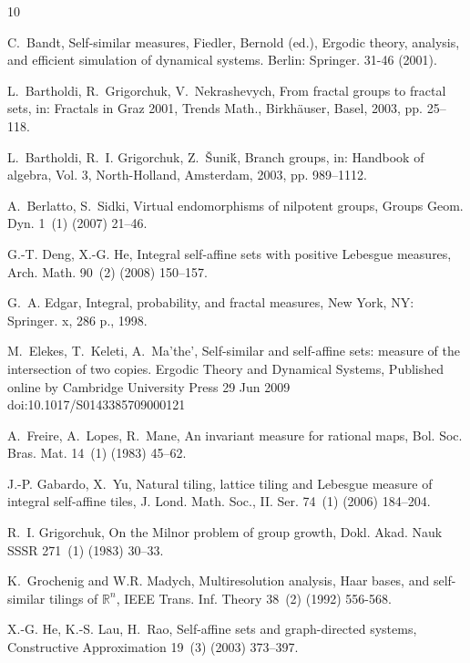\documentclass[12pt]{article}
\theoremstyle{definition}
\begin{document}

%
\begin{thebibliography}{10}

C.~Bandt, Self-similar measures, {Fiedler, Bernold (ed.), Ergodic theory,
  analysis, and efficient simulation of dynamical systems. Berlin: Springer.
  31-46 (2001).}

L.~Bartholdi, R.~Grigorchuk, V.~Nekrashevych, From fractal groups to fractal
  sets, in: Fractals in Graz 2001, Trends Math., Birkh\"auser, Basel, 2003, pp.
  25--118.

L.~Bartholdi, R.~I. Grigorchuk, Z.~{\v{S}}uni{\'k}, Branch groups, in: Handbook
  of algebra, Vol. 3, North-Holland, Amsterdam, 2003, pp. 989--1112.

A.~Berlatto, S.~Sidki, Virtual endomorphisms of nilpotent groups, Groups
  Geom. Dyn. 1~(1) (2007) 21--46.

G.-T. Deng, X.-G. He, Integral self-affine sets with positive Lebesgue
  measures, Arch. Math. 90~(2) (2008) 150--157.

G.~A. Edgar, Integral, probability, and fractal measures, {New York, NY:
  Springer. x, 286 p.}, 1998.

M.~Elekes, T.~Keleti, A.~Ma'the', Self-similar and self-affine sets: measure of the intersection of
two copies. Ergodic Theory and Dynamical Systems,  Published online by Cambridge University Press
29 Jun 2009 doi:10.1017/S0143385709000121


A.~Freire, A.~Lopes, R.~Mane, An invariant measure for rational maps, Bol.
  Soc. Bras. Mat. 14~(1) (1983) 45--62.

J.-P. Gabardo, X.~Yu, Natural tiling, lattice tiling and Lebesgue measure of
  integral self-affine tiles, J. Lond. Math. Soc., II. Ser. 74~(1) (2006)
  184--204.

R.~I. Grigorchuk, On the {M}ilnor problem of group growth, Dokl. Akad. Nauk
  SSSR 271~(1) (1983) 30--33.

K.~Grochenig and W.R. Madych, Multiresolution analysis, Haar bases, and self-similar tilings of
  $\mathbb{R}^n$,  IEEE Trans. Inf. Theory 38~(2) (1992) 556-568.


X.-G. He, K.-S. Lau, H.~Rao, Self-affine sets and graph-directed systems,
  Constructive Approximation 19~(3) (2003) 373--397.


\end{thebibliography}
\end{document}
